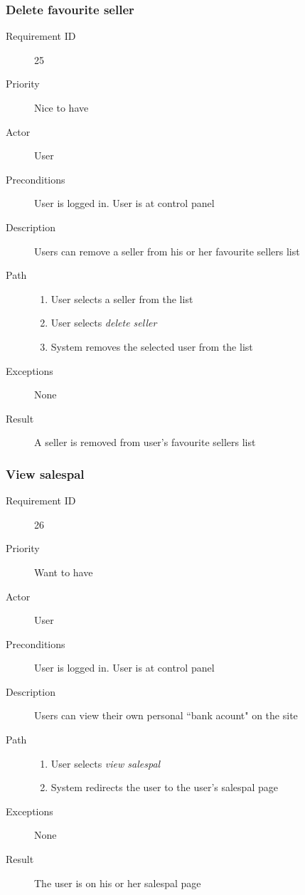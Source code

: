 		\subsubsection{Delete favourite seller}
			\begin{description}
				\item[Requirement ID] 25
				\item[Priority] Nice to have
				\item[Actor] User
				\item[Preconditions] User is logged in. User is at control panel
				\item[Description] Users can remove a seller from his or her favourite sellers list
				\item[Path]
 					\begin{enumerate}
						\item User selects a seller from the list
						\item User selects \emph{delete seller} 
						\item System removes the selected user from the list
					\end{enumerate}
				\item[Exceptions] None
				\item[Result] A seller is removed from user's favourite sellers list
			\end{description}
		\subsubsection{View salespal}
			\begin{description}
				\item[Requirement ID] 26
				\item[Priority] Want to have
				\item[Actor] User
				\item[Preconditions] User is logged in. User is at control panel
				\item[Description] Users can view their own personal ``bank acount" on the site
				\item[Path]
 					\begin{enumerate}
						\item User selects \emph{view salespal}
						\item System redirects the user to the user's salespal page
					\end{enumerate}
				\item[Exceptions] None
				\item[Result] The user is on his or her salespal page
			\end{description}
